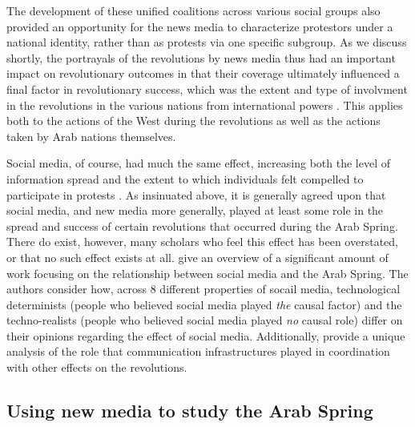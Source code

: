 The development of these unified coalitions across various social groups also provided an opportunity for the news media to characterize protestors under a national identity, rather than as protests via one specific subgroup.  As we discuss shortly, the portrayals of the revolutions by news media thus had an important impact on revolutionary outcomes in that their coverage ultimately influenced a final factor in revolutionary success, which was the extent and type of involvment in the revolutions in the various nations from international powers \cite{goldstone_bringing_2013,comunello_will_2012}.  This applies both to the actions of the West during the revolutions as well as the actions taken by Arab nations themselves.  

Social media, of course, had much the same effect, increasing both the level of information spread and the extent to which individuals felt compelled to participate in protests \cite{tufekci_social_2012,wolfsfeld_social_2013,bellin_reconsidering_2012}. As insinuated above, it is generally agreed upon that social media, and new media more generally, played at least some role in the spread and success of certain revolutions that occurred during the Arab Spring.  There do exist, however, many scholars who feel this effect has been overstated, or that no such effect exists at all. \cite{comunello_will_2012} give an overview of a significant amount of work focusing on the relationship between social media and the Arab Spring.  The authors consider how, across 8 different properties of socail media, technological determinists (people who believed social media played \emph{the} causal factor) and the techno-realists (people who believed social media played \emph{no} causal role) differ on their opinions regarding the effect of social media.  Additionally, \cite{hussain_what_2013} provide a unique analysis of the role that communication infrastructures played in coordination with other effects on the revolutions.

\subsection{Using new media to study the Arab Spring}

